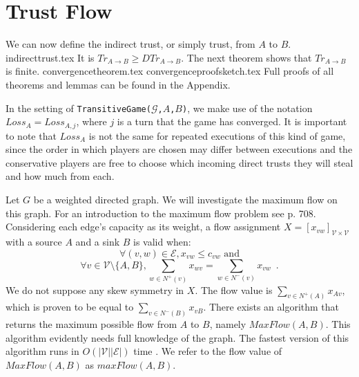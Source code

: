 \section{Trust Flow}
  We can now define the indirect trust, or simply trust, from $A$ to $B$.
  {indirecttrust.tex}
  \noindent It is $Tr_{A \rightarrow B} \geq DTr_{A \rightarrow B}$. The next theorem shows that
  $Tr_{A \rightarrow B}$ is finite.
  {convergencetheorem.tex}
  {convergenceproofsketch.tex}
  Full proofs of all theorems and lemmas can be found in the Appendix.

  In the setting of \texttt{TransitiveGame(}$\mathcal{G}$\texttt{,}$A$\texttt{,}$B$\texttt{)}, we make use of the notation
  $Loss_A = Loss_{A, j}$, where $j$ is a turn that the game has converged. It is important to note that $Loss_A$ is
  not the same for repeated executions of this kind of game, since the order in which players are chosen may differ between
  executions and the conservative players are free to choose which incoming direct trusts they will steal and how much from
  each.

  Let $G$ be a weighted directed graph. We will investigate the maximum flow on this graph. For an introduction to the
  maximum flow problem see \cite{clrs} p. 708. Considering each edge's capacity as its weight, a flow assignment
  $X = [x_{vw}]_{\mathcal{V} \times \mathcal{V}}$ with a source $A$ and a sink $B$ is valid when:
  \begin{equation}
  \label{flow1}
    \forall (v, w) \in \mathcal{E}, x_{vw} \leq c_{vw} \mbox{ and}
  \end{equation}
  \begin{equation}
  \label{flow2}
    \forall v \in \mathcal{V} \setminus \{A,B\}, \sum\limits_{w \in N^{+}(v)}x_{wv} = \sum\limits_{w \in N^{-}(v)}x_{vw}
    \enspace.
  \end{equation}
  We do not suppose any skew symmetry in $X$. The flow value is $\sum\limits_{v \in N^{+}\left(A\right)}x_{Av}$, which is
  proven to be equal to $\sum\limits_{v \in N^{-}\left(B\right)}x_{vB}$. There exists an algorithm that returns the maximum
  possible flow from $A$ to $B$, namely $MaxFlow\left(A, B\right)$. This algorithm evidently needs full knowledge of the
  graph. The fastest version of this algorithm runs in $O\left(|\mathcal{V}||\mathcal{E}|\right)$ time \cite{maxflownm}. We
  refer to the flow value of $MaxFlow\left(A, B\right)$ as $maxFlow\left(A, B\right)$.

